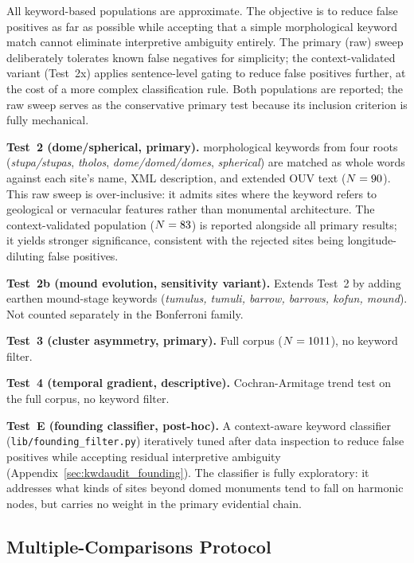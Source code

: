 \documentclass[12pt,a4paper]{article}
\begin{document}
All keyword-based populations are approximate. The objective is to
reduce false positives as far as possible while accepting that a
simple morphological keyword match cannot eliminate interpretive
ambiguity entirely. The primary (raw) sweep deliberately tolerates
known false negatives for simplicity; the context-validated variant
(Test~2x) applies sentence-level gating to reduce false positives
further, at the cost of a more complex classification rule.
Both populations are reported; the raw sweep serves as the
conservative primary test because its inclusion criterion is
fully mechanical.

\textbf{Test~2 (dome/spherical, primary).}
\NcircKeywords{} morphological keywords from four roots
(\textit{stupa/stupas}, \textit{tholos}, \textit{dome/domed/domes},
\textit{spherical}) are matched as whole words against each site's
name, XML description, and extended OUV text ($N = 90$).
This raw sweep is over-inclusive: it admits sites where the keyword
refers to geological or vernacular features rather than monumental
architecture. The context-validated population ($N = 83$)
is reported alongside all primary results; it yields stronger
significance, consistent with the rejected sites being
longitude-diluting false positives.

\textbf{Test~2b (mound evolution, sensitivity variant).}
Extends Test~2 by adding earthen mound-stage keywords
(\textit{tumulus, tumuli, barrow, barrows, kofun, mound}).
Not counted separately in the Bonferroni family.

\textbf{Test~3 (cluster asymmetry, primary).}
Full corpus ($N = 1011$), no keyword filter.

\textbf{Test~4 (temporal gradient, descriptive).}
Cochran-Armitage trend test on the full corpus, no keyword filter.

\textbf{Test~E (founding classifier, post-hoc).}
A context-aware keyword classifier
(\texttt{lib/founding\_filter.py}) iteratively tuned after data
inspection to reduce false positives while accepting residual
interpretive ambiguity
(Appendix~\ref{sec:kwdaudit_founding}). The classifier is fully
exploratory: it addresses what kinds of sites beyond domed
monuments tend to fall on harmonic nodes, but carries no weight
in the primary evidential chain.

\subsection{Multiple-Comparisons Protocol}
\label{sec:bonferroni}
\end{document}

